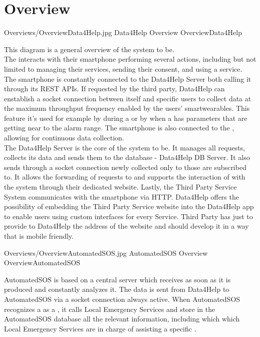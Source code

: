 \documentclass[../../DD.tex]{subfiles}
\begin{document}
\section{Overview}

	\image {13cm} {Overviews/OverviewData4Help.jpg} {Data4Help Overview} {OverviewData4Help}

	This diagram is a general overview of the system to be.\\
	The  interacts with their smartphone performing several actions, including but not limited to managing their services, sending their consent, and using a service. The smartphone is constantly connected to the Data4Help Server both calling it through its REST APIs. If requested by the third party, Data4Help can enstablish a socket connection between itself and specific users to collect data at the maximum throughput frequency enabled by the users' smartwearables. This feature it's used for example by  during a  or by  when a  has parameters that are getting near to the alarm range. The smartphone is also connected to the , allowing for continuous data collection.\\
	The Data4Help Server is the core of the system to be. It manages all  requests, collects its data and sends them to the database - Data4Help DB Server. It also sends through a socket connection newly collected  only to those  are subscribed to. It allows the forwarding of  requests to  and supports the interaction of  with the system through their dedicated website.
	Lastly, the Third Party Service System communicates with the  smartphone via HTTP. Data4Help offers the possibility of embedding the Third Party Service website into the Data4Help app to enable users using custom interfaces for every Service. Third Party has just to provide to Data4Help the address of the website and should develop it in a way that is mobile friendly.



	\image {13cm} {Overviews/OverviewAutomatedSOS.jpg} {AutomatedSOS Overview} {OverviewAutomatedSOS}

	AutomatedSOS is based on a central server which receives  as soon as it is produced and constantly analyzes it. The data is sent from Data4Help to AutomatedSOS via a socket connection always active. When AutomatedSOS recognizes a  as a , it calls Local Emergency Services and store in the AutomatedSOS database all the relevant information, including which which Local Emergency Services are in charge of assisting a specific .
\end{document}
